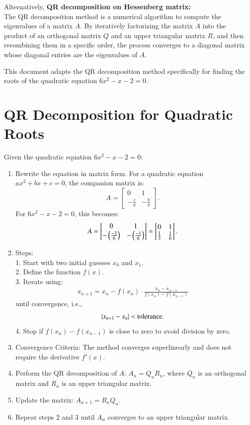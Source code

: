 \documentclass[journal]{IEEEtran}
\begin{document}
Alternatively, \textbf{QR decomposition on Hessenberg matrix:}\\
The QR decomposition method is a numerical algorithm to compute the eigenvalues of a matrix \( A \). By iteratively factorizing the matrix \( A \) into the product of an orthogonal matrix \( Q \) and an upper triangular matrix \( R \), and then recombining them in a specific order, the process converges to a diagonal matrix whose diagonal entries are the eigenvalues of \( A \).

This document adapts the QR decomposition method specifically for finding the roots of the quadratic equation \( 6x^2 - x - 2 = 0 \).

\section*{QR Decomposition for Quadratic Roots}
Given the quadratic equation \( 6x^2 - x - 2 = 0 \):

\begin{enumerate}
    \item Rewrite the equation in matrix form. For a quadratic equation \( ax^2 + bx + c = 0 \), the companion matrix is:
    \[
    A = \begin{bmatrix}
    0 & 1 \\
    -\frac{c}{a} & -\frac{b}{a}
    \end{bmatrix}.
    \]
    For \( 6x^2 - x - 2 = 0 \), this becomes:
    \[
    A = \begin{bmatrix}
    0 & 1 \\
    -\left(\frac{-2}{6}\right) & -\left(\frac{-1}{6}\right)
    \end{bmatrix} = \begin{bmatrix}
    0 & 1 \\
    \frac{1}{3} & \frac{1}{6}
    \end{bmatrix}.
    \]\item{Steps:}\\
1. Start with two initial guesses $x_0$  and $x_1$.\\
2. Define the function $f(x)$.\\
3. Iterate using:
   \begin{align}
   x_{n+1} = x_n - f(x_n) \cdot \frac{x_n - x_{n-1}}{f(x_n) - f(x_{n-1})}    
   \end{align}
   until convergence, i.e.,
   \begin{align}
   \left\vert x_{n+1} - x_n\right\vert < \text{tolerance}.
   \end{align}
4. Stop if $ f(x_n) - f(x_{n-1}) $ is close to zero to avoid division by zero.

\item{Convergence Criteria:}
The method converges superlinearly and does not require the derivative $ f'(x) $.

    \item Perform the QR decomposition of \( A \): \( A_n = Q_n R_n \), where \( Q_n \) is an orthogonal matrix and \( R_n \) is an upper triangular matrix.
    \item Update the matrix: \( A_{n+1} = R_n Q_n \).
    \item Repeat steps 2 and 3 until \( A_n \) converges to an upper triangular matrix.
\end{enumerate}
\end{document}
